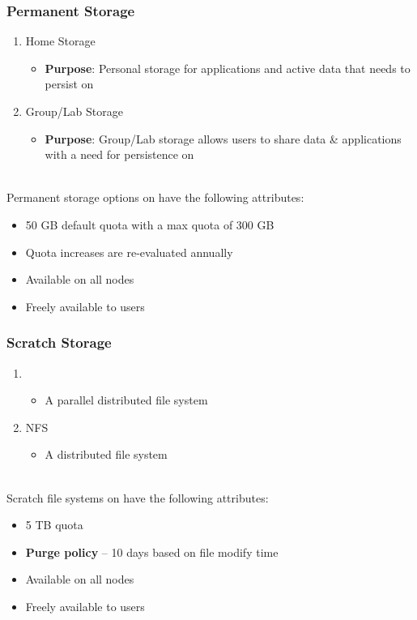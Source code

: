 \begin{frame}
  \frametitle{Permanent Storage}
  \begin{enumerate}
  \item Home Storage
    \begin{itemize}
    \item {\textbf{Purpose}}: Personal storage for applications and active data that needs to persist on {\mana}
    \end{itemize}
  \item Group/Lab Storage
    \begin{itemize}
    \item {\textbf{Purpose}}: Group/Lab storage allows users to share data \& applications with a need for persistence on {\mana}
    \end{itemize}
  \end{enumerate}
~\\
  Permanent storage options on {\mana} have the following attributes:
  \begin{itemize}
  \item 50 GB default quota with a max quota of 300 GB
  \item Quota increases are re-evaluated annually
  \item Available on all nodes
  \item Freely available to users
  \end{itemize}

\end{frame}


\begin{frame}
  \frametitle{Scratch Storage}
  \begin{enumerate}
    \item {\lustre}
      \begin{itemize}
			\item A parallel distributed file system 
      \end{itemize}
    \item NFS
      \begin{itemize}
			\item A distributed file system 
      \end{itemize}
  \end{enumerate}
~\\
  Scratch file systems on {\mana} have the following attributes:
  \begin{itemize}
	\item 5 TB quota
  \item \textbf{Purge policy} -- 10 days based on file modify time
  \item Available on all nodes
  \item Freely available to users
  \end{itemize}

\end{frame}



